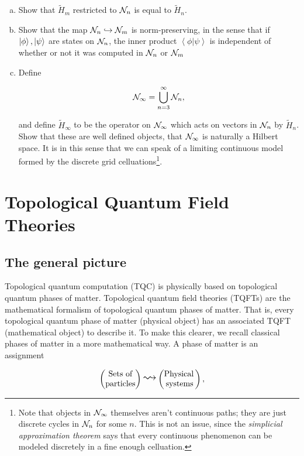 \documentclass{article}
\theoremstyle{definition}
\numberwithin{figure}{section}
\begin{document}
\begin{enumerate}[\thesection .1.]
\begin{enumerate}[(a)]
\item Show that $\tilde{H}_{m}$ restricted to $\mathcal{N}_{n}$ is equal to $\tilde{H}_n$.

\item  Show that the map $\mathcal{N}_{n}\hookrightarrow{}\mathcal{N}_{m}$ is norm-preserving, in the sense that if $\left|\phi\right>,\left|\psi\right>$ are states on $\mathcal{N}_{n}$, the inner product $\left<\phi | \psi \right>$ is independent of whether or not it was computed in $\mathcal{N}_{n}$ or $\mathcal{N}_{m}$

\item Define

$$\mathcal{N}_{\infty}=\bigcup_{n=3}^{\infty}\mathcal{N}_{n},$$

and define $\tilde{H}_{\infty}$ to be the operator on $\mathcal{N}_{\infty}$ which acts on vectors in $\mathcal{N}_{n}$ by $\tilde{H}_n$. Show that these are well defined objects, that $\mathcal{N}_{\infty}$ is naturally a Hilbert space. It is in this sense that we can speak of a limiting continuous model formed by the discrete grid celluations\footnote{Note that objects in $\mathcal{N}_{\infty}$ themselves aren't continuous paths; they are just discrete cycles in $\mathcal{N}_n$ for some $n$. This is not an issue, since the \textit{simplicial approximation theorem} says that every continuous phenomenon can be modeled discretely in a fine enough celluation.}.
\end{enumerate}
\end{enumerate}

\section{Topological Quantum Field Theories}
\label{TQFTs}

\subsection{The general picture}
\label{The general picture}

Topological quantum computation (TQC) is physically based on topological quantum phases of matter. Topological quantum field theories (TQFTs) are the mathematical formalism of topological quantum phases of matter. That is, every topological quantum phase of matter (physical object) has an associated TQFT (mathematical object) to describe it. To make this clearer, we recall classical phases of matter in a more mathematical way. A phase of matter is an assignment

$$
\begin{pmatrix}
\text{Sets of} \\
\text{particles}
\end{pmatrix}
\bigleadsto
\begin{pmatrix}
\text{Physical\,} \\ \text{systems}
\end{pmatrix},
$$
\end{document}
